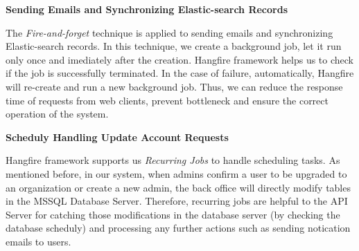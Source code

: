\textbf{Sending Emails and Synchronizing Elastic-search Records}

The \textit{Fire-and-forget} technique is applied to sending emails and synchronizing Elastic-search records.
In this technique, we create a background job, let it run only once and imediately after the creation.
Hangfire framework helps us to check if the job is successfully terminated. In the case of failure, automatically, Hangfire will re-create and
run a new background job. Thus, we can reduce the response time of requests from web clients, prevent bottleneck and ensure the correct operation of the system.

\textbf{Scheduly Handling Update Account Requests}

Hangfire framework supports us \textit{Recurring Jobs} to handle scheduling tasks.
As mentioned before, in our system, when admins confirm a user to be upgraded to an organization or create a new admin,
the back office will directly modify tables in the MSSQL Database Server.
Therefore, recurring jobs are helpful to the API Server for catching those modifications in the database server
(by checking the database scheduly) and processing any further actions such as sending notication emails to
users.
